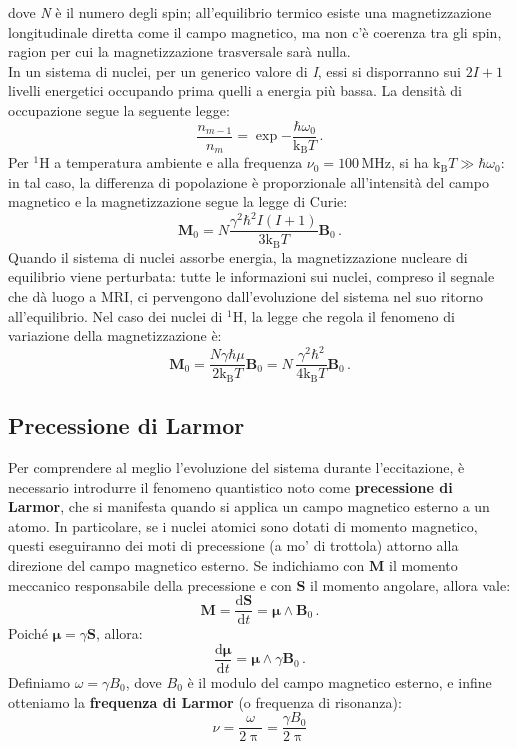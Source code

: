 \documentclass{report}
\numberwithin{equation}{section}
\numberwithin{figure}{section}
\renewcommand{\Vec}{\bm}
\begin{document}
dove \textit{N} è il numero degli spin; all'equilibrio termico esiste una magnetizzazione longitudinale diretta come il campo magnetico, ma non c'è coerenza tra gli spin, ragion per cui la magnetizzazione trasversale sarà nulla.\\
In un sistema di nuclei, per un generico valore di \textit{I}, essi si disporranno sui $2I+1$ livelli energetici occupando prima quelli a energia più bassa. La densità di occupazione segue la seguente legge:
\begin{equation}
    \frac{n_{m-1}}{n_m}=\exp{-\frac{\hbar \omega_0}{\mathrm{k_B}T}} \,.
\end{equation}
Per $\mathrm{^1H}$ a temperatura ambiente e alla frequenza $\nu_0 = 100$\,MHz, si ha $\mathrm{k_B}T \gg \hbar \omega_0$: in tal caso, la differenza di popolazione è proporzionale all'intensità del campo magnetico e la magnetizzazione segue la legge di Curie:
\begin{equation}
    \Vec{M}_0=N \frac{\gamma^2 \hbar^2 I(I+1)}{3\mathrm{k_B}T}\Vec{B}_0 \,.
\end{equation}
Quando il sistema di nuclei assorbe energia, la magnetizzazione nucleare di equilibrio viene perturbata: tutte le informazioni sui nuclei, compreso il segnale che dà luogo a MRI, ci pervengono dall'evoluzione del sistema nel suo ritorno all'equilibrio. Nel caso dei nuclei di $\mathrm{^1H}$, la legge che regola il fenomeno di variazione della magnetizzazione è:
\begin{equation}
    \Vec{M}_0=\frac{N \gamma \hbar \mu}{2\mathrm{k_B}T}\Vec{B}_0 = N\,\frac{\gamma^2 \hbar^2}{4\mathrm{k_B}T}\Vec{B}_0 \,.
\end{equation}

\subsection{Precessione di Larmor}
Per comprendere al meglio l'evoluzione del sistema durante l'eccitazione, è necessario introdurre il fenomeno quantistico noto come \textbf{precessione di Larmor}, che si manifesta quando si applica un campo magnetico esterno a un atomo. In particolare, se i nuclei atomici sono dotati di momento magnetico, questi eseguiranno dei moti di precessione (a mo' di trottola) attorno alla direzione del campo magnetico esterno. Se indichiamo con $\Vec{M}$ il momento meccanico responsabile della precessione e con $\Vec{S}$ il momento angolare, allora vale:
\begin{equation}
    \Vec{M}=\frac{\mathrm{d}\Vec{S}}{\mathrm{d}t}=\Vec{\mu}\wedge\Vec{B}_0\,.
\end{equation}
Poiché $\Vec{\mu}=\gamma \Vec{S}$, allora:
\begin{equation}
    \frac{\mathrm{d}\Vec{\mu}}{\mathrm{d}t}=\Vec{\mu}\wedge\gamma\Vec{B}_0\,.
\end{equation}
Definiamo $\omega=\gamma B_0$, dove $B_0$ è il modulo del campo magnetico esterno, e infine otteniamo la \textbf{frequenza di Larmor} (o frequenza di risonanza):
\begin{equation}
    \boxed{\nu=\frac{\omega}{2\uppi}=\frac{\gamma B_0}{2\uppi}}
    \label{larmor}
\end{equation}
\end{document}
